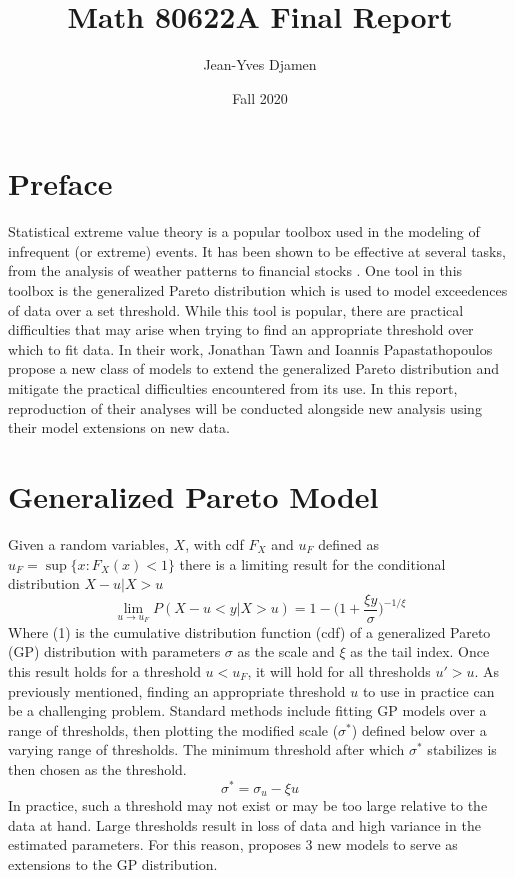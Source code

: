 \documentclass[12pt]{article}
\title{Math 80622A Final Report}
\author{Jean-Yves Djamen }
\date{Fall 2020}
\theoremstyle{definition}
\theoremstyle{definition}
\begin{document}
\maketitle
\tableofcontents{}
\doublespacing

\pagebreak


\section{Preface}
Statistical extreme value theory is a popular toolbox used in the modeling of infrequent (or extreme) events. It has been shown to be effective at several tasks, from the analysis of weather patterns \cite{test1} to financial stocks \cite{test2}. One tool in this toolbox is the generalized Pareto distribution which is used to model exceedences of data over a set threshold. While this tool is popular, there are practical difficulties that may arise when trying to find an appropriate threshold over which to fit data. In their work, \cite{papatawn} Jonathan Tawn and Ioannis Papastathopoulos propose a new class of models to extend the generalized Pareto distribution and mitigate the practical difficulties encountered from its use. In this report, reproduction of their analyses will be conducted alongside new analysis using their model extensions on new data. 

\section{Generalized Pareto Model}
Given a random variables, $X$, with cdf $F_X$ and $u_F$ defined as $u_F= \sup\{x: F_X(x)<1\}$ there is  a limiting result \cite{gpd} for the conditional distribution $X-u|X>u$ 
\[ \lim_{u\rightarrow u_F }P(X-u < y|X>u) = 1-\bigg( 1+ \frac{\xi y}{\sigma}\bigg)^{-1/\xi} \tag{1}\]
Where (1) is the cumulative distribution function (cdf) of a generalized Pareto (GP) distribution with parameters $\sigma$ as the scale and $\xi$ as the tail index. Once this result holds for a threshold $u<u_F$, it will hold for all thresholds $u'>u$. As previously mentioned, finding an appropriate threshold $u$ to use in practice can be a challenging problem. Standard methods include fitting GP models over a range of thresholds, then plotting the modified scale ($\sigma^*$) defined below over a varying range of thresholds. The minimum threshold after which $\sigma^*$ stabilizes is then chosen as the threshold.
\[\sigma^*= \sigma_u-\xi u\]
In practice, such a threshold may not exist or may be too large relative to the data at hand. Large thresholds result in loss of data and high variance in the estimated parameters. For this reason, \cite{papatawn} proposes 3 new models to serve as extensions to the GP distribution. 
\end{document}
